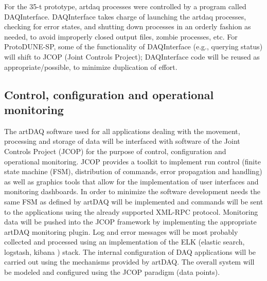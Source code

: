  
For the 35-t prototype, artdaq processes were controlled by a program called
DAQInterface. DAQInterface takes 
charge of launching the artdaq processes, checking for error states, and
shutting down
 processes in an orderly fashion as needed, to avoid improperly closed output files,
zombie processes, etc. For ProtoDUNE-SP, some of the functionality of DAQInterface (e.g., querying  status) will shift to JCOP (Joint Controls Project);
DAQInterface code will be reused as appropriate/possible, to minimize duplication of effort. 



\subsection{Control, configuration and operational monitoring}

The artDAQ software used for all applications dealing with the movement,
processing and storage of data will be interfaced with software of the
Joint Controls Project (JCOP) for the purpose of control, configuration
and operational monitoring.  JCOP provides a toolkit to implement run
control (finite state machine (FSM), distribution of commands, error
propagation and handling) as well as graphics tools that allow for the
implementation of user interfaces and monitoring dashboards.  In order to
minimize the software development needs the same FSM as defined by artDAQ
will be implemented and commands will be sent to the applications using
the already supported XML-RPC protocol.  Monitoring data will be pushed
into the JCOP framework by implementing the appropriate artDAQ monitoring
plugin.  Log and error messages will be most probably collected and
processed using an implementation of the ELK (elastic search, logstash,
kibana \cite{elastic:kibana}) stack. 
 The internal configuration of DAQ applications will be
carried out using the mechanisms provided by artDAQ. The overall system
will be modeled and configured using the JCOP paradigm (data points).


